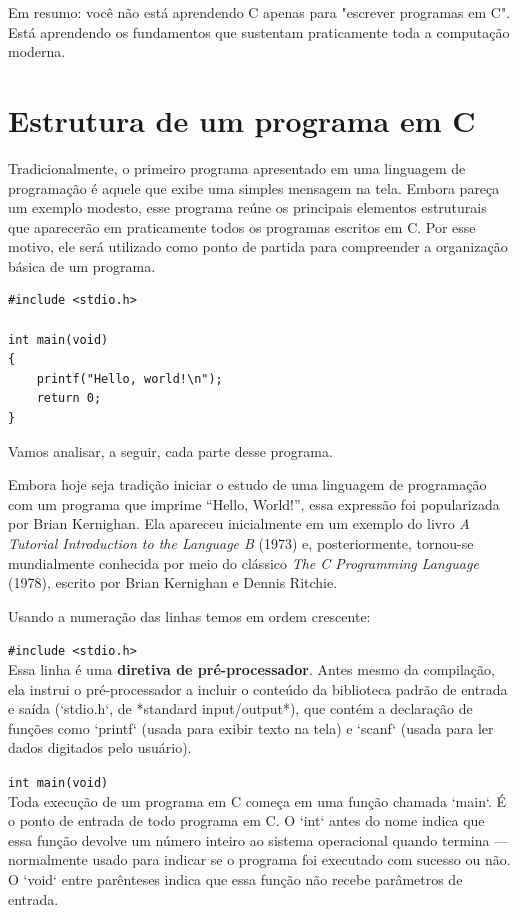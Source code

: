 \documentclass[12pt,a4paper,oneside]{extreport}
\begin{document}
Em resumo: você não está aprendendo C apenas para "escrever programas em C". Está aprendendo os fundamentos que sustentam praticamente toda a computação moderna.


\section{Estrutura de um programa em C}

Tradicionalmente, o primeiro programa apresentado em uma linguagem de programação é aquele que exibe uma simples mensagem na tela. Embora pareça um exemplo modesto, esse programa reúne os principais elementos estruturais que aparecerão em praticamente todos os programas escritos em C. Por esse motivo, ele será utilizado como ponto de partida para compreender a organização básica de um programa.

\begin{lstlisting}
#include <stdio.h>

int main(void)
{
    printf("Hello, world!\n");
    return 0;
}
\end{lstlisting}

Vamos analisar, a seguir, cada parte desse programa.

\begin{tcolorbox}[title=Curiosidade]

Embora hoje seja tradição iniciar o estudo de uma linguagem de programação
com um programa que imprime ``Hello, World!'', essa expressão foi
popularizada por Brian Kernighan. Ela apareceu inicialmente em um exemplo do
livro \textit{A Tutorial Introduction to the Language B} (1973) e,
posteriormente, tornou-se mundialmente conhecida por meio do clássico
\textit{The C Programming Language} (1978), escrito por Brian Kernighan e
Dennis Ritchie.

\end{tcolorbox}

Usando a numeração das linhas temos em ordem crescente:

\texttt{\#include <stdio.h>} \\
Essa linha é uma \textbf{diretiva de pré-processador}. Antes mesmo da compilação, ela instrui o pré-processador a incluir o conteúdo da biblioteca padrão de entrada e saída (`stdio.h`, de *standard input/output*), que contém a declaração de funções como `printf` (usada para exibir texto na tela) e `scanf` (usada para ler dados digitados pelo usuário).

\texttt{int main(void)} \\
Toda execução de um programa em C começa em uma função chamada `main`. É o ponto de entrada de todo programa em C. O `int` antes do nome indica que essa função devolve um número inteiro ao sistema operacional quando termina — normalmente usado para indicar se o programa foi executado com sucesso ou não. O `void` entre parênteses indica que essa função não recebe parâmetros de entrada.
\end{document}
